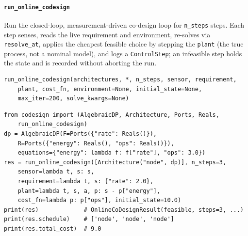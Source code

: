 \documentclass[11pt,a4paper]{article}
\begin{document}
\paragraph{\texttt{run\_online\_codesign}}\label{ref:online_codesign:run_online_codesign}
Run the closed-loop, measurement-driven co-design loop for \texttt{n\_steps}
steps. Each step senses, reads the live requirement and environment,
re-solves via \texttt{resolve\_at}, applies the cheapest feasible choice by
stepping the \texttt{plant} (the true process, not a nominal model), and logs
a \texttt{ControlStep}; an infeasible step holds the state and is recorded
without aborting the run.

\begin{lstlisting}
run_online_codesign(architectures, *, n_steps, sensor, requirement,
    plant, cost_fn, environment=None, initial_state=None,
    max_iter=200, solve_kwargs=None)
\end{lstlisting}

\begin{lstlisting}
from codesign import (AlgebraicDP, Architecture, Ports, Reals,
    run_online_codesign)
dp = AlgebraicDP(F=Ports({"rate": Reals()}),
    R=Ports({"energy": Reals(), "ops": Reals()}),
    equations={"energy": lambda f: f["rate"], "ops": 3.0})
res = run_online_codesign([Architecture("node", dp)], n_steps=3,
    sensor=lambda t, s: s,
    requirement=lambda t, s: {"rate": 2.0},
    plant=lambda t, s, a, p: s - p["energy"],
    cost_fn=lambda p: p["ops"], initial_state=10.0)
print(res)             # OnlineCoDesignResult(feasible, steps=3, ...)
print(res.schedule)    # ['node', 'node', 'node']
print(res.total_cost)  # 9.0
\end{lstlisting}
\end{document}

